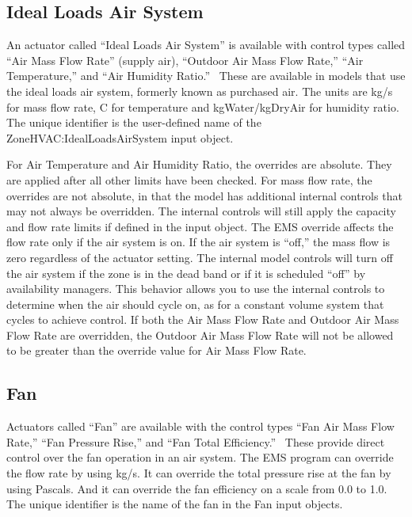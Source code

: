 \subsection{Ideal Loads Air System}\label{ideal-loads-air-system}

An actuator called ``Ideal Loads Air System'' is available with control types called ``Air Mass Flow Rate'' (supply air), ``Outdoor Air Mass Flow Rate,'' ``Air Temperature,'' and ``Air Humidity Ratio.'' ~These are available in models that use the ideal loads air system, formerly known as purchased air. The units are kg/s for mass flow rate, C for temperature and kgWater/kgDryAir for humidity ratio. The unique identifier is the user-defined name of the ZoneHVAC:IdealLoadsAirSystem input object.

For Air Temperature and Air Humidity Ratio, the overrides are absolute. They are applied after all other limits have been checked. For mass flow rate, the overrides are not absolute, in that the model has additional internal controls that may not always be overridden. The internal controls will still apply the capacity and flow rate limits if defined in the input object. The EMS override affects the flow rate only if the air system is on. If the air system is ``off,'' the mass flow is zero regardless of the actuator setting. The internal model controls will turn off the air system if the zone is in the dead band or if it is scheduled ``off'' by availability managers. This behavior allows you to use the internal controls to determine when the air should cycle on, as for a constant volume system that cycles to achieve control. If both the Air Mass Flow Rate and Outdoor Air Mass Flow Rate are overridden, the Outdoor Air Mass Flow Rate will not be allowed to be greater than the override value for Air Mass Flow Rate.

\subsection{Fan}\label{fan}

Actuators called ``Fan'' are available with the control types ``Fan Air Mass Flow Rate,'' ``Fan Pressure Rise,'' and ``Fan Total Efficiency.''~ These provide direct control over the fan operation in an air system. The EMS program can override the flow rate by using kg/s. It can override the total pressure rise at the fan by using Pascals. And it can override the fan efficiency on a scale from 0.0 to 1.0. The unique identifier is the name of the fan in the Fan input objects.

